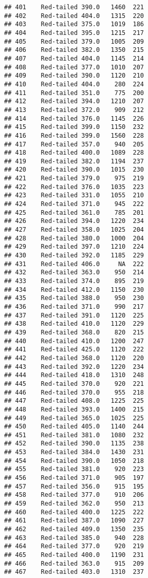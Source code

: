 \documentclass[
]{article}
\begin{document}
\begin{verbatim}
## 401    Red-tailed 390.0   1460  221
## 402    Red-tailed 404.0   1315  220
## 403    Red-tailed 375.0   1019  186
## 404    Red-tailed 395.0   1215  217
## 405    Red-tailed 379.0   1005  209
## 406    Red-tailed 382.0   1350  215
## 407    Red-tailed 404.0   1145  214
## 408    Red-tailed 377.0   1010  207
## 409    Red-tailed 390.0   1120  210
## 410    Red-tailed 404.0    280  224
## 411    Red-tailed 351.0    775  200
## 412    Red-tailed 394.0   1210  207
## 413    Red-tailed 372.0    909  212
## 414    Red-tailed 376.0   1145  226
## 415    Red-tailed 399.0   1150  232
## 416    Red-tailed 399.0   1560  228
## 417    Red-tailed 357.0    940  205
## 418    Red-tailed 400.0   1089  228
## 419    Red-tailed 382.0   1194  237
## 420    Red-tailed 390.0   1015  230
## 421    Red-tailed 379.0    975  219
## 422    Red-tailed 376.0   1035  223
## 423    Red-tailed 331.0   1055  210
## 424    Red-tailed 371.0    945  222
## 425    Red-tailed 361.0    785  201
## 426    Red-tailed 394.0   1220  234
## 427    Red-tailed 358.0   1025  204
## 428    Red-tailed 380.0   1000  204
## 429    Red-tailed 397.0   1210  224
## 430    Red-tailed 392.0   1185  229
## 431    Red-tailed 406.0     NA  222
## 432    Red-tailed 363.0    950  214
## 433    Red-tailed 374.0    895  219
## 434    Red-tailed 412.0   1150  230
## 435    Red-tailed 388.0    950  230
## 436    Red-tailed 371.0    990  217
## 437    Red-tailed 391.0   1120  225
## 438    Red-tailed 410.0   1120  229
## 439    Red-tailed 368.0    820  215
## 440    Red-tailed 410.0   1200  247
## 441    Red-tailed 425.0   1120  222
## 442    Red-tailed 368.0   1120  220
## 443    Red-tailed 392.0   1220  234
## 444    Red-tailed 418.0   1310  248
## 445    Red-tailed 370.0    920  221
## 446    Red-tailed 370.0    955  218
## 447    Red-tailed 408.0   1225  225
## 448    Red-tailed 393.0   1400  215
## 449    Red-tailed 365.0   1025  225
## 450    Red-tailed 405.0   1140  244
## 451    Red-tailed 381.0   1080  232
## 452    Red-tailed 390.0   1135  238
## 453    Red-tailed 384.0   1430  231
## 454    Red-tailed 390.0   1050  218
## 455    Red-tailed 381.0    920  223
## 456    Red-tailed 371.0    905  197
## 457    Red-tailed 356.0    915  195
## 458    Red-tailed 377.0    910  206
## 459    Red-tailed 362.0    950  213
## 460    Red-tailed 400.0   1225  222
## 461    Red-tailed 387.0   1090  227
## 462    Red-tailed 409.0   1350  235
## 463    Red-tailed 385.0    940  228
## 464    Red-tailed 377.0    920  219
## 465    Red-tailed 400.0   1190  231
## 466    Red-tailed 363.0    915  209
## 467    Red-tailed 403.0   1310  237

\end{verbatim}
\end{document}
